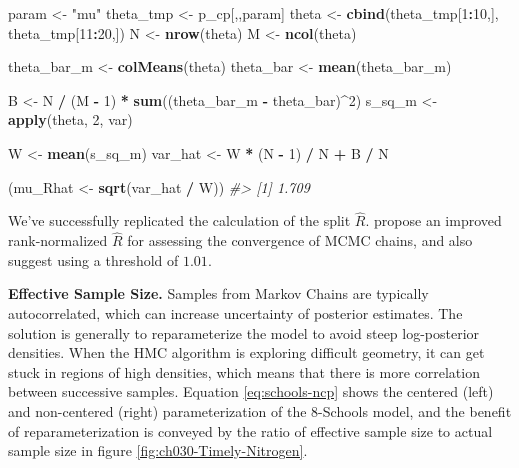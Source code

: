 \documentclass[11pt, oneside, openany]{scrbook}
\newenvironment{Shaded}{\begin{snugshade}}{\end{snugshade}}
\newcommand{\CommentTok}[1]{\textcolor[rgb]{0.56,0.35,0.01}{\textit{#1}}}
\newcommand{\DecValTok}[1]{\textcolor[rgb]{0.00,0.00,0.81}{#1}}
\newcommand{\KeywordTok}[1]{\textcolor[rgb]{0.13,0.29,0.53}{\textbf{#1}}}
\newcommand{\NormalTok}[1]{#1}
\newcommand{\OperatorTok}[1]{\textcolor[rgb]{0.81,0.36,0.00}{\textbf{#1}}}
\newcommand{\StringTok}[1]{\textcolor[rgb]{0.31,0.60,0.02}{#1}}
\begin{document}
\begin{Shaded}
\begin{Highlighting}[]
\NormalTok{param <-}\StringTok{ "mu"}
\NormalTok{theta_tmp <-}\StringTok{ }\NormalTok{p_cp[,,param]}
\NormalTok{theta <-}\StringTok{ }\KeywordTok{cbind}\NormalTok{(theta_tmp[}\DecValTok{1}\OperatorTok{:}\DecValTok{10}\NormalTok{,], theta_tmp[}\DecValTok{11}\OperatorTok{:}\DecValTok{20}\NormalTok{,])}
\NormalTok{N     <-}\StringTok{ }\KeywordTok{nrow}\NormalTok{(theta)}
\NormalTok{M     <-}\StringTok{ }\KeywordTok{ncol}\NormalTok{(theta)}

\NormalTok{theta_bar_m <-}\StringTok{ }\KeywordTok{colMeans}\NormalTok{(theta)}
\NormalTok{theta_bar   <-}\StringTok{ }\KeywordTok{mean}\NormalTok{(theta_bar_m)}

\NormalTok{B <-}\StringTok{ }\NormalTok{N }\OperatorTok{/}\StringTok{ }\NormalTok{(M }\OperatorTok{-}\StringTok{ }\DecValTok{1}\NormalTok{) }\OperatorTok{*}\StringTok{ }\KeywordTok{sum}\NormalTok{((theta_bar_m }\OperatorTok{-}\StringTok{ }\NormalTok{theta_bar)}\OperatorTok{^}\DecValTok{2}\NormalTok{)}
\NormalTok{s_sq_m <-}\StringTok{ }\KeywordTok{apply}\NormalTok{(theta, }\DecValTok{2}\NormalTok{, var)}

\NormalTok{W <-}\StringTok{ }\KeywordTok{mean}\NormalTok{(s_sq_m)}
\NormalTok{var_hat <-}\StringTok{ }\NormalTok{W }\OperatorTok{*}\StringTok{ }\NormalTok{(N }\OperatorTok{-}\StringTok{ }\DecValTok{1}\NormalTok{) }\OperatorTok{/}\StringTok{ }\NormalTok{N }\OperatorTok{+}\StringTok{ }\NormalTok{B }\OperatorTok{/}\StringTok{ }\NormalTok{N}

\NormalTok{(mu_Rhat <-}\StringTok{ }\KeywordTok{sqrt}\NormalTok{(var_hat }\OperatorTok{/}\StringTok{ }\NormalTok{W))}
\CommentTok{#> [1] 1.709}
\end{Highlighting}
\end{Shaded}


We've successfully replicated the calculation of the split \(\hat{R}\). \citet{vehtari2020rank} propose an improved rank-normalized \(\hat{R}\) for assessing the convergence of MCMC chains, and also suggest using a threshold of \(1.01\).

\textbf{Effective Sample Size.} Samples from Markov Chains are typically autocorrelated, which can increase uncertainty of posterior estimates. The solution is generally to reparameterize the model to avoid steep log-posterior densities. When the HMC algorithm is exploring difficult geometry, it can get stuck in regions of high densities, which means that there is more correlation between successive samples. Equation \eqref{eq:schools-ncp} shows the centered (left) and non-centered (right) parameterization of the 8-Schools model, and the benefit of reparameterization is conveyed by the ratio of effective sample size to actual sample size in figure \ref{fig:ch030-Timely-Nitrogen}.
\end{document}
